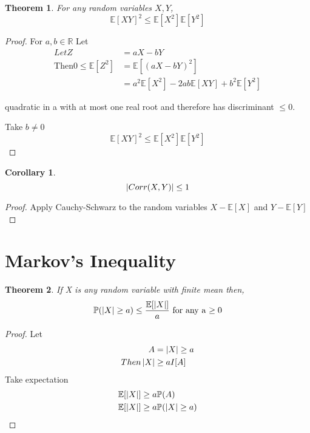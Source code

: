 \documentclass{notes}
\theoremstyle{plain}
\newtheorem{theorem}{Theorem}[chapter]
\newtheorem*{corollary}{Corollary}
\newcommand{\bP}{\mathbb{P}}
\newcommand{\bR}{\mathbb{R}}
\newcommand{\bE}{\mathbb{E}}
\newcommand{\prob}[1]{\bP \negthinspace\left(#1\right)}
\newcommand{\expect}[1]{\bE\!\left[#1\right]}
\begin{document}
\begin{theorem}
For any random variables $X,Y$,
\[
\expect{XY}^2 \leq \expect{X^2}\expect{Y^2}
\]
\end{theorem}
\begin{proof}
For $ a,b \in \bR$ Let 
\begin{align*}
Let Z &= aX -bY\\
\text{Then} 0 \leq \expect{Z^2} &= \expect{(aX - bY)^2}\\
&= a^2\expect{X^2} - 2ab\expect{XY} + b^2\expect{Y^2}
\end{align*}

quadratic in a with at most one real root and therefore has
discriminant $\leq 0$.

Take $b\neq0$
\[
\expect{XY}^2 \leq \expect{X^2}\expect{Y^2}
\]
\end{proof}
\begin{corollary}
\[
\left|Corr(X,Y)\right| \leq 1
\]
\end{corollary}
\begin{proof}
Apply Cauchy-Schwarz to the random variables $X-\expect{X}$ and $Y- \expect{Y}$
\end{proof}
\section{Markov's Inequality}
\begin{theorem}
If X is any random variable with finite mean then,
\[
\prob{\abs{X}\geq a} \leq \frac{\expect{\abs{X}}}{a} \text{ for any a $ \ge 0$}
\]
\end{theorem}

\begin{proof}
Let 
\begin{align*}
A &= {\left|X\right| \geq a}\\
Then \left|X\right| &\geq a I[A]
\end{align*}
Take expectation
\begin{align*}
\expect{\abs{X}} &\geq a \prob{A}\\
\expect{\abs{X}} &\geq a \prob{\abs{X} \geq a}
\end{align*}
\end{proof}
\end{document}
